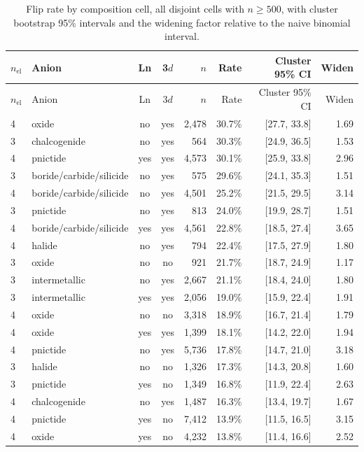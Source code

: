 \documentclass[11pt]{article}
\begin{document}
\footnotesize
\begin{longtable}{llccrrrr}
\caption{Flip rate by composition cell, all disjoint cells with $n \ge 500$, with cluster bootstrap 95\% intervals and the widening factor relative to the naive binomial interval.}\label{tab:appcells}\\
\toprule
$n_{\text{el}}$ & Anion & Ln & 3$d$ & $n$ & Rate & Cluster 95\% CI & Widen \\
\midrule
\endfirsthead
\toprule
$n_{\text{el}}$ & Anion & Ln & 3$d$ & $n$ & Rate & Cluster 95\% CI & Widen \\
\midrule
\endhead
4 & oxide & no & yes & 2{,}478 & 30.7\% & [27.7, 33.8] & 1.69 \\
3 & chalcogenide & no & yes & 564 & 30.3\% & [24.9, 36.5] & 1.53 \\
4 & pnictide & yes & yes & 4{,}573 & 30.1\% & [25.9, 33.8] & 2.96 \\
3 & boride/carbide/silicide & no & yes & 575 & 29.6\% & [24.1, 35.3] & 1.51 \\
4 & boride/carbide/silicide & no & yes & 4{,}501 & 25.2\% & [21.5, 29.5] & 3.14 \\
3 & pnictide & no & yes & 813 & 24.0\% & [19.9, 28.7] & 1.51 \\
4 & boride/carbide/silicide & yes & yes & 4{,}561 & 22.8\% & [18.5, 27.4] & 3.65 \\
4 & halide & no & yes & 794 & 22.4\% & [17.5, 27.9] & 1.80 \\
3 & oxide & no & no & 921 & 21.7\% & [18.7, 24.9] & 1.17 \\
3 & intermetallic & no & yes & 2{,}667 & 21.1\% & [18.4, 24.0] & 1.80 \\
3 & intermetallic & yes & yes & 2{,}056 & 19.0\% & [15.9, 22.4] & 1.91 \\
4 & oxide & no & no & 3{,}318 & 18.9\% & [16.7, 21.4] & 1.79 \\
4 & oxide & yes & yes & 1{,}399 & 18.1\% & [14.2, 22.0] & 1.94 \\
4 & pnictide & no & yes & 5{,}736 & 17.8\% & [14.7, 21.0] & 3.18 \\
3 & halide & no & no & 1{,}326 & 17.3\% & [14.3, 20.8] & 1.60 \\
3 & pnictide & yes & no & 1{,}349 & 16.8\% & [11.9, 22.4] & 2.63 \\
4 & chalcogenide & no & yes & 1{,}487 & 16.3\% & [13.4, 19.7] & 1.67 \\
4 & pnictide & yes & no & 7{,}412 & 13.9\% & [11.5, 16.5] & 3.15 \\
4 & oxide & yes & no & 4{,}232 & 13.8\% & [11.4, 16.6] & 2.52 \\

\end{longtable}
\end{document}
